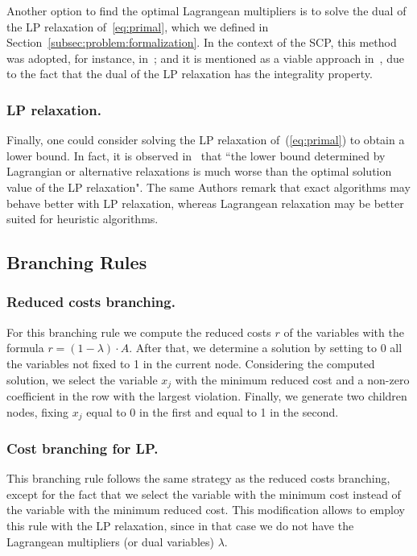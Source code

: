 \documentclass[runningheads]{llncs}
\begin{document}
Another option to find the optimal Lagrangean multipliers is to solve the dual of the LP relaxation of~\ref{eq:primal}, which we defined in Section~\ref{subsec:problem:formalization}. In the context of the SCP, this method was adopted, for instance, in~\cite{beasley-1987-algorithm,balas-ho-2009-set-covering}; and it is mentioned as a viable approach in~\cite{caprara-2000-algorithms}, due to the fact that the dual of the LP relaxation has the integrality property.

\subsubsection{LP relaxation.} Finally, one could consider solving the LP relaxation of~(\ref{eq:primal}) to obtain a lower bound. In fact, it is observed in~\cite{caprara-2000-algorithms} that ``the lower bound determined by Lagrangian or alternative relaxations is much worse than the optimal solution value of the LP relaxation". The same Authors remark that exact algorithms may behave better with LP relaxation, whereas Lagrangean relaxation may be better suited for heuristic algorithms.   

\subsection{Branching Rules}
\label{subsec:branch-bound:branch}

\subsubsection{Reduced costs branching.} For this branching rule we compute the reduced costs $r$ of the variables with the formula $r = (1 - \lambda) \cdot A$. After that, we determine a solution by setting to 0 all the variables not fixed to 1 in the current node. Considering the computed solution, we select the variable $x_j$ with the minimum reduced cost and a non-zero coefficient in the row with the largest violation. Finally, we generate two children nodes, fixing $x_j$ equal to 0 in the first and equal to 1 in the second.

\subsubsection{Cost branching for LP.} This branching rule follows the same strategy as the reduced costs branching, except for the fact that we select the variable with the minimum cost instead of the variable with the minimum reduced cost. This modification allows to employ this rule with the LP relaxation, since in that case we do not have the Lagrangean multipliers (or dual variables) $\lambda$. 
\end{document}
